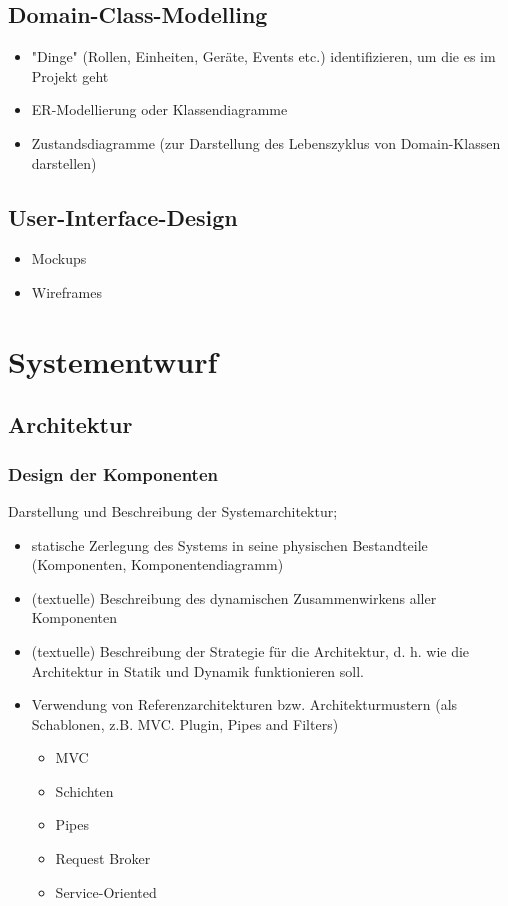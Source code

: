 \section{Domain-Class-Modelling}
\begin{itemize}
	\item "Dinge" (Rollen, Einheiten, Geräte, Events etc.) identifizieren, um die es im Projekt geht
	\item ER-Modellierung oder Klassendiagramme
	\item Zustandsdiagramme (zur Darstellung des Lebenszyklus von Domain-Klassen darstellen)
\end{itemize}

\section{User-Interface-Design}
\begin{itemize}
	\item Mockups
	\item Wireframes
\end{itemize}


\chapter{Systementwurf}

\section{Architektur}

\subsection{Design der Komponenten}

Darstellung und Beschreibung der Systemarchitektur;

\begin{itemize}
	\item  statische Zerlegung des Systems in seine physischen Bestandteile (Komponenten, Komponentendiagramm)
	\item (textuelle) Beschreibung des dynamischen Zusammenwirkens aller Komponenten 
	\item (textuelle) Beschreibung der Strategie für die Architektur, d. h. wie die Architektur in Statik und Dynamik funktionieren soll.
	\item Verwendung von Referenzarchitekturen bzw. Architekturmustern (als Schablonen, z.B. MVC. Plugin, Pipes and Filters)
	\begin{itemize}
		\item MVC
		\item Schichten
		\item Pipes
		\item Request Broker
		\item Service-Oriented
	\end{itemize}
\end{itemize}

